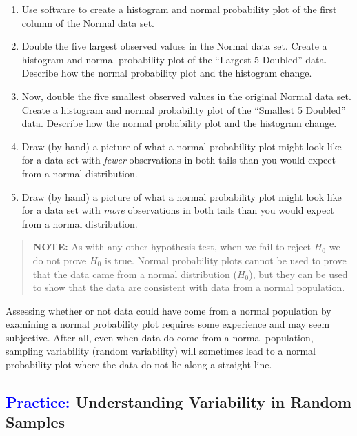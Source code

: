 \documentclass[
]{report}
\begin{document}
\begin{enumerate}
\def\labelenumi{(\alph{enumi})}
\item
  Use software to create a histogram and normal probability plot of the first column of the Normal data set.
\item
  Double the five largest observed values in the Normal data set. Create a histogram and normal probability plot of the ``Largest 5 Doubled'' data. Describe how the normal probability plot and the histogram change.
\item
  Now, double the five smallest observed values in the original Normal data set. Create a histogram and normal probability plot of the ``Smallest 5 Doubled'' data. Describe how the normal probability plot and the histogram change.
\item
  Draw (by hand) a picture of what a normal probability plot might look like for a data set with \emph{fewer} observations in both tails than you would expect from a normal distribution.
\item
  Draw (by hand) a picture of what a normal probability plot might look like for a data set with \emph{more} observations in both tails than you would expect from a normal distribution.
\end{enumerate}

\begin{quote}
\textbf{NOTE:} As with any other hypothesis test, when we fail to reject \(\scriptstyle H_0\) we do not prove \(\scriptstyle H_0\) is true. Normal probability plots cannot be used to prove that the data came from a normal distribution (\(\scriptstyle H_0\)), but they can be used to show that the data are consistent with data from a normal population.
\end{quote}

Assessing whether or not data could have come from a normal population by examining a normal probability plot requires some experience and may seem subjective. After all, even when data do come from a normal population, sampling variability (random variability) will sometimes lead to a normal probability plot where the data do not lie along a straight line.

\hypertarget{understanding-variability-in-random-samples}{%
\subsection*{\texorpdfstring{\textcolor{blue}{Practice:} Understanding Variability in Random Samples}{ Understanding Variability in Random Samples}}\label{understanding-variability-in-random-samples}}
\end{document}
